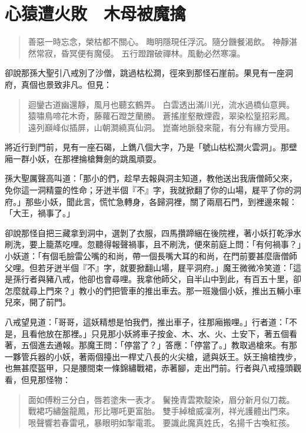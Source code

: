 
\chapter{心猿遭火敗　木母被魔擒}

\begin{quote}
善惡一時忘念，榮枯都不關心。
晦明隱現任浮沉。隨分饑餐渴飲。
神靜湛然常寂，昏冥便有魔侵。
五行蹬蹭破禪林。風動必然寒凜。
\end{quote}

卻說那孫大聖引八戒別了沙僧，跳過枯松澗，徑來到那怪石崖前。果見有一座洞府，真個也景致非凡。但見：
\begin{quote}
迴鑾古道幽還靜，風月也聽玄鶴弄。
白雲透出滿川光，流水過橋仙意興。
猿嘯鳥啼花木奇，藤蘿石蹬芝蘭勝。
蒼搖崖壑散煙霞，翠染松篁招彩鳳。
遠列巔峰似插屏，山朝澗繞真仙洞。
崑崙地脈發來龍，有分有緣方受用。
\end{quote}

將近行到門前，見有一座石碣，上鐫八個大字，乃是「號山枯松澗火雲洞」。那壁廂一群小妖，在那裡掄槍舞劍的跳風頑耍。

孫大聖厲聲高叫道：「那小的們，趁早去報與洞主知道，教他送出我唐僧師父來，免你這一洞精靈的性命；牙迸半個『不』字，我就掀翻了你的山場，屣平了你的洞府。」那些小妖，聞此言，慌忙急轉身，各歸洞裡，關了兩扇石門，到裡邊來報：「大王，禍事了。」

卻說那怪自把三藏拿到洞中，選剝了衣服，四馬攢蹄綑在後院裡，著小妖打乾淨水刷洗，要上籠蒸吃哩。忽聽得報聲禍事，且不刷洗，便來前庭上問：「有何禍事？」小妖道：「有個毛臉雷公嘴的和尚，帶一個長嘴大耳的和尚，在門前要甚麼唐僧師父哩。但若牙迸半個『不』字，就要掀翻山場，屣平洞府。」魔王微微冷笑道：「這是孫行者與豬八戒，他卻也會尋哩。我拿他師父，自半山中到此，有百五十里，卻怎麼就尋上門來？」教小的們把管車的推出車去。那一班幾個小妖，推出五輛小車兒來，開了前門。

八戒望見道：「哥哥，這妖精想是怕我們，推出車子，往那廂搬哩。」行者道：「不是，且看他放在那裡。」只見那小妖將車子按金、木、水、火、土安下，著五個看著，五個進去通報。那魔王問：「停當了？」答應：「停當了。」教取過槍來。有那一夥管兵器的小妖，著兩個擡出一桿丈八長的火尖槍，遞與妖王。妖王掄槍拽步，也無甚麼盔甲，只是腰間束一條錦繡戰裙，赤著腳，走出門前。行者與八戒擡頭觀看，但見那怪物：
\begin{quote}
面如傅粉三分白，唇若塗朱一表才。
鬢挽青雲欺靛染，眉分新月似刀裁。
戰裙巧繡盤龍鳳，形比哪吒更富胎。
雙手綽槍威凜冽，祥光護體出門來。
哏聲響若春雷吼，暴眼明如掣電乖。
要識此魔真姓氏，名揚千古喚紅孩。
\end{quote}

